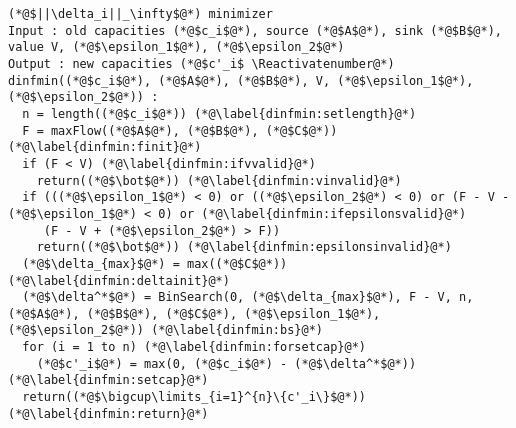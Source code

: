 {}
\Suppressnumber
\begin{lstlisting}[label=dinf, style=numbers]
(*@$||\delta_i||_\infty$@*) minimizer
Input : old capacities (*@$c_i$@*), source (*@$A$@*), sink (*@$B$@*), value V, (*@$\epsilon_1$@*), (*@$\epsilon_2$@*)
Output : new capacities (*@$c'_i$ \Reactivatenumber@*)
dinfmin((*@$c_i$@*), (*@$A$@*), (*@$B$@*), V, (*@$\epsilon_1$@*), (*@$\epsilon_2$@*)) :
  n = length((*@$c_i$@*)) (*@\label{dinfmin:setlength}@*)
  F = maxFlow((*@$A$@*), (*@$B$@*), (*@$C$@*)) (*@\label{dinfmin:finit}@*)
  if (F < V) (*@\label{dinfmin:ifvvalid}@*)
    return((*@$\bot$@*)) (*@\label{dinfmin:vinvalid}@*)
  if (((*@$\epsilon_1$@*) < 0) or ((*@$\epsilon_2$@*) < 0) or (F - V - (*@$\epsilon_1$@*) < 0) or (*@\label{dinfmin:ifepsilonsvalid}@*)
     (F - V + (*@$\epsilon_2$@*) > F))
    return((*@$\bot$@*)) (*@\label{dinfmin:epsilonsinvalid}@*)
  (*@$\delta_{max}$@*) = max((*@$C$@*)) (*@\label{dinfmin:deltainit}@*)
  (*@$\delta^*$@*) = BinSearch(0, (*@$\delta_{max}$@*), F - V, n, (*@$A$@*), (*@$B$@*), (*@$C$@*), (*@$\epsilon_1$@*), (*@$\epsilon_2$@*)) (*@\label{dinfmin:bs}@*)
  for (i = 1 to n) (*@\label{dinfmin:forsetcap}@*)
    (*@$c'_i$@*) = max(0, (*@$c_i$@*) - (*@$\delta^*$@*)) (*@\label{dinfmin:setcap}@*)
  return((*@$\bigcup\limits_{i=1}^{n}\{c'_i\}$@*)) (*@\label{dinfmin:return}@*)
\end{lstlisting}
